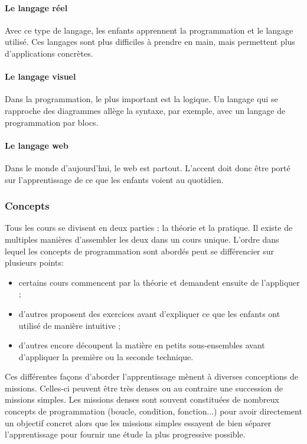 \paragraph{Le langage réel} Avec ce type de langage, les enfants apprennent la programmation et le langage utilisé. Ces langages sont plus difficiles à prendre en main, mais permettent plus d'applications concrètes.
\paragraph{Le langage visuel} Dans la programmation, le plus important est la logique. Un langage qui se rapproche des diagrammes allège la syntaxe, par exemple, avec un langage de programmation par \glspl{bloc}.
\paragraph{Le langage web} Dans le monde d'aujourd'hui, le web est partout. L'accent doit donc être porté sur l'apprentissage de ce que les enfants voient au quotidien.


\subsubsection{Concepts}
Tous les cours se divisent en deux parties : la théorie et la pratique. Il existe de multiples manières d'assembler les deux dans un cours unique. L'ordre dans lequel les concepts de programmation sont abordés peut se différencier sur plusieurs points:
\begin{itemize}
  \item certains cours commencent par la théorie et demandent ensuite de l'appliquer ;
  \item d'autres proposent des exercices avant d'expliquer ce que les enfants ont utilisé de manière intuitive ;
  \item d'autres encore découpent la matière en petits sous-ensembles avant d'appliquer la première ou la seconde technique.\\
\end{itemize}


Ces différentes façons d'aborder l'apprentissage mènent à diverses conceptions de \glspl{mission}. Celles-ci peuvent être très denses ou au contraire une succession de \glspl{mission} simples. Les \glspl{mission} denses sont souvent constituées de nombreux concepts de programmation (boucle, condition, fonction...) pour avoir directement un objectif concret alors que les \glspl{mission} simples essayent de bien séparer l'apprentissage pour fournir une étude la plus progressive possible.\\


